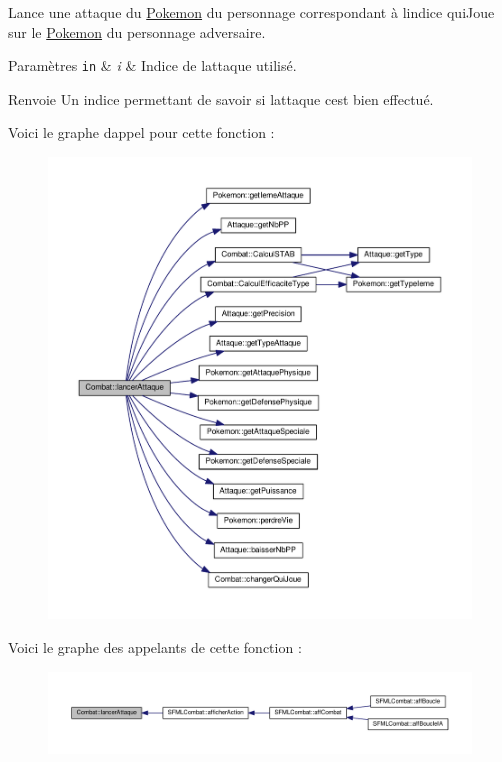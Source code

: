 Lance une attaque du \hyperlink{class_pokemon}{Pokemon} du personnage correspondant à l\textquotesingle{}indice qui\+Joue sur le \hyperlink{class_pokemon}{Pokemon} du personnage adversaire. 
\begin{DoxyParams}[1]{Paramètres}
\mbox{\tt in}  & {\em i} & Indice de l\textquotesingle{}attaque utilisé. \\
\hline
\end{DoxyParams}
\begin{DoxyReturn}{Renvoie}
Un indice permettant de savoir si l\textquotesingle{}attaque c\textquotesingle{}est bien effectué. 
\end{DoxyReturn}
Voici le graphe d\textquotesingle{}appel pour cette fonction \+:\nopagebreak
\begin{figure}[H]
\begin{center}
\leavevmode
\includegraphics[width=350pt]{class_combat_a310a968bf21791e88753ca6c6a024d8d_cgraph}
\end{center}
\end{figure}
Voici le graphe des appelants de cette fonction \+:\nopagebreak
\begin{figure}[H]
\begin{center}
\leavevmode
\includegraphics[width=350pt]{class_combat_a310a968bf21791e88753ca6c6a024d8d_icgraph}
\end{center}
\end{figure}
\mbox{\label{class_combat_a7ff4ea33e3bafa37fd8f5a0754955b4f}} 
